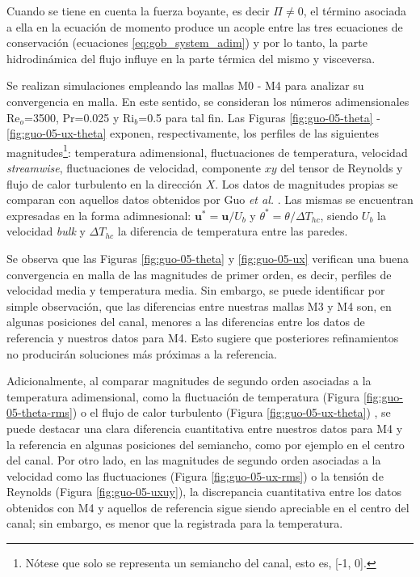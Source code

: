 Cuando se tiene en cuenta la fuerza boyante, es decir $\Pi \neq 0$, el término asociada a ella en la ecuación de momento produce un acople entre las tres ecuaciones de conservación (ecuaciones \ref{eq:gob_system_adim}) y por lo tanto, la parte hidrodinámica del flujo influye en la parte térmica del mismo y visceversa. 

Se realizan simulaciones empleando las mallas M0 - M4 para analizar su convergencia en malla. En este sentido, se consideran los números adimensionales Re$_o$=3500, Pr=0.025 y Ri$_b$=0.5 para tal fin. Las Figuras \ref{fig:guo-05-theta} - \ref{fig:guo-05-ux-theta} exponen, respectivamente, los perfiles de las siguientes magnitudes\footnote{Nótese que solo se representa un semiancho del canal, esto es, [-1, 0].}: temperatura adimensional, fluctuaciones de temperatura, velocidad \textit{streamwise}, fluctuaciones de velocidad, componente $xy$ del tensor de Reynolds y flujo de calor turbulento en la dirección $X$. Los datos de magnitudes propias se comparan con aquellos datos obtenidos por Guo \textit{et al.} \cite{guo2022direct}. Las mismas se encuentran expresadas en la forma adimnesional: $\mathbf{u^*} = \mathbf{u} / U_b$ y $\theta^* = \theta / \Delta T_{hc}$, siendo $U_b$ la velocidad \textit{bulk} y $\Delta T_{hc}$ la diferencia de temperatura entre las paredes.

Se observa que las Figuras \ref{fig:guo-05-theta} y \ref{fig:guo-05-ux} verifican una buena convergencia en malla de las  magnitudes de primer orden, es decir, perfiles de velocidad media y temperatura media. Sin embargo, se puede identificar por simple observación, que las diferencias entre nuestras mallas M3 y M4 son, en algunas posiciones del canal, menores a las diferencias entre los datos de referencia y nuestros datos para M4. Esto sugiere que posteriores refinamientos no producirán soluciones más próximas a la referencia. 

Adicionalmente, al comparar magnitudes de segundo orden asociadas a la temperatura adimensional, como la fluctuación de temperatura (Figura \ref{fig:guo-05-theta-rms}) o el flujo de calor turbulento (Figura \ref{fig:guo-05-ux-theta}) , se puede destacar una clara diferencia cuantitativa entre nuestros datos para M4 y la referencia en algunas posiciones del semiancho, como por ejemplo en el centro del canal. Por otro lado, en las magnitudes de segundo orden asociadas a la velocidad como las fluctuaciones (Figura \ref{fig:guo-05-ux-rms}) o la tensión de Reynolds (Figura \ref{fig:guo-05-uxuy}), la discrepancia cuantitativa entre los datos obtenidos con M4 y aquellos de referencia sigue siendo apreciable en el centro del canal; sin embargo, es menor que la registrada para la temperatura.

